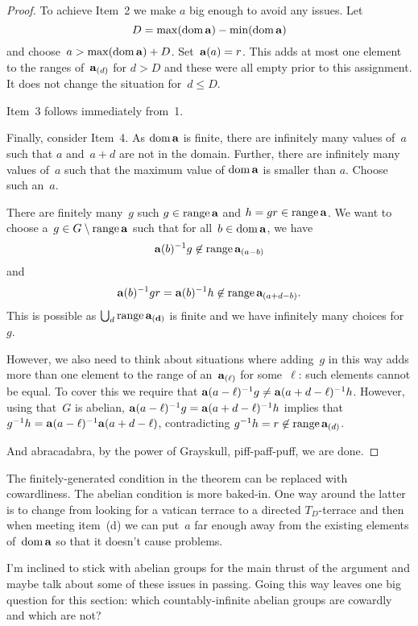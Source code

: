 \documentclass[a4paper,12pt]{article}
\newcommand{\dom}{\mathop{\rm dom}\nolimits}
\newcommand{\range}{\mathop{\rm range}\nolimits}
\begin{document}
\begin{proof}
To achieve Item~2 we make $a$ big enough to avoid any issues.  Let $$D = \max(\dom{{\bf a}}) - \min(\dom{{\bf a}})$$ and choose~$a > \max(\dom{{\bf a}}) + D$.  Set~${\bf a}(a) = r$.  This adds at most one element to the ranges of~${\bf a}_{(d)}$ for $d > D$ and these were all empty prior to this assignment.  It does not change the situation for~$d \leq D$.

Item~3 follows immediately from~1.

Finally, consider Item~4.  As $\dom{{\bf a}}$ is finite, there are infinitely many values of~$a$ such that $a$ and~$a+d$ are not in the domain.   Further, there are infinitely many values of~$a$ such that the maximum value of $\dom{{\bf a}}$  is smaller than $a$.  Choose such an~$a$.  

There are finitely many~$g$ such $g \in \range{{\bf a}}$ and $h = gr \in  \range{{\bf a}}$.  We want to choose a~$g \in G \setminus \range{{\bf a}}$ such that for all~$b \in \dom{{\bf a}}$, we have $${\bf a}(b)^{-1}g \not\in \range{{\bf a}_{(a-b)}}$$ and $$  {\bf a}(b)^{-1}gr =  {\bf a}(b)^{-1}h \not\in \range{{\bf a}_{(a+d-b)}}.$$
This is possible as $\bigcup_{d} \range{{\bf a_{(d)}}}$ is finite and we have infinitely many choices for~$g$.

However, we also need to think about situations where adding~$g$ in this way adds more than one element to the range of an~${\bf a}_{(\ell)}$ for some~$\ell$: such elements cannot be equal. To cover this we require that ${\bf a}(a-\ell)^{-1}g \neq {\bf a}(a+d-\ell)^{-1}h$.  However, using that~$G$ is abelian, ${\bf a}(a-\ell)^{-1}g = {\bf a}(a+d-\ell)^{-1}h$ implies that $g^{-1}h = {\bf a}(a-\ell)^{-1}{\bf a}(a+d-\ell)$, contradicting $g^{-1}h = r \not\in \range{{\bf a}_{(d)}}$.


And abracadabra, by the power of Grayskull, piff-paff-puff, we are done.
\end{proof}

The finitely-generated condition in the theorem can be replaced with cowardliness.  The abelian condition is more baked-in.  One way around the latter is to change from looking for a vatican terrace to a directed $T_D$-terrace and then when meeting item~(d) we can put~$a$ far enough away from the existing elements of~$\dom {\bf a}$ so that it doesn't cause problems.

I'm inclined to stick with abelian groups for the main thrust of the argument and maybe talk about some of these issues in passing.  Going this way leaves one big question for this section: which countably-infinite abelian groups are cowardly and which are not?
\end{document}

